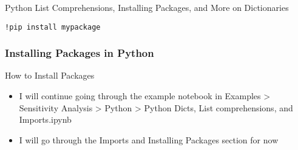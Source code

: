 \documentclass[handout, 11pt]{beamer}
\begin{document}
\begin{section}{Python List Comprehensions, Installing Packages, and More on Dictionaries}
\begin{frame}
\begin{itemize}
\texttt{!pip install mypackage}
\end{itemize}
\end{frame}
\begin{frame}
\frametitle{Installing Packages in Python}
{
\begin{block}{How to Install Packages}
\begin{itemize}
\item I will continue going through the example notebook in Examples > Sensitivity Analysis > Python > Python Dicts, List comprehensions, and Imports.ipynb
\item I will go through the Imports and Installing Packages section for now
\end{itemize}
\end{block}
}
\end{frame}
\end{section}
\end{document}

